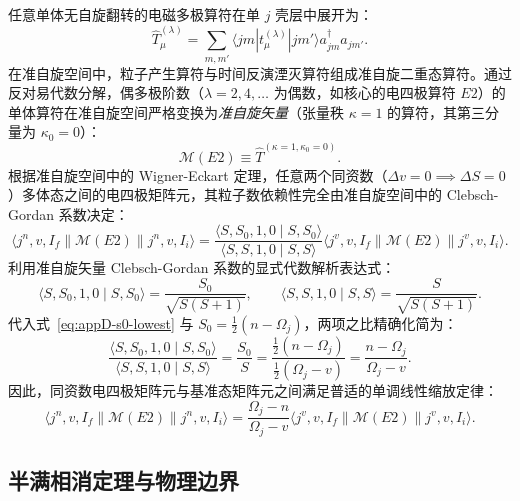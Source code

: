 任意单体无自旋翻转的电磁多极算符在单 $j$ 壳层中展开为：
\begin{equation}\label{eq:appD-one-body-em-op}
\hat{T}^{(\lambda)}_\mu = \sum_{m, m'} \langle j m | t^{(\lambda)}_\mu | j m' \rangle a_{jm}^\dagger a_{jm'}.
\end{equation}
在准自旋空间中，粒子产生算符与时间反演湮灭算符组成准自旋二重态算符。通过反对易代数分解，偶多极阶数（$\lambda = 2, 4, \dots$ 为偶数，如核心的电四极算符 $E2$）的单体算符在准自旋空间严格变换为\emph{准自旋矢量}（张量秩 $\kappa = 1$ 的算符，其第三分量为 $\kappa_0 = 0$）：
\begin{equation}\label{eq:appD-e2-quasispin-vector}
\mathcal{M}(E2) \equiv \hat{T}^{(\kappa=1, \kappa_0=0)}.
\end{equation}
根据准自旋空间中的 Wigner-Eckart 定理，任意两个同资数（$\Delta v = 0 \implies \Delta S = 0$）多体态之间的电四极矩阵元，其粒子数依赖性完全由准自旋空间中的 Clebsch-Gordan 系数决定：
\begin{equation}\label{eq:appD-wigner-eckart-quasispin}
\langle j^n, v, I_f \| \mathcal{M}(E2) \| j^n, v, I_i \rangle = \frac{\langle S, S_0, 1, 0 \mid S, S_0 \rangle}{\langle S, S, 1, 0 \mid S, S \rangle} \langle j^v, v, I_f \| \mathcal{M}(E2) \| j^v, v, I_i \rangle.
\end{equation}
利用准自旋矢量 Clebsch-Gordan 系数的显式代数解析表达式：
\begin{equation}\label{eq:appD-cg-analytical}
\langle S, S_0, 1, 0 \mid S, S_0 \rangle = \frac{S_0}{\sqrt{S(S+1)}}, \qquad \langle S, S, 1, 0 \mid S, S \rangle = \frac{S}{\sqrt{S(S+1)}}.
\end{equation}
代入式~\eqref{eq:appD-s0-lowest} 与 $S_0 = \frac{1}{2}(n - \Omega_j)$，两项之比精确化简为：
\begin{equation}\label{eq:appD-cg-ratio}
\frac{\langle S, S_0, 1, 0 \mid S, S_0 \rangle}{\langle S, S, 1, 0 \mid S, S \rangle} = \frac{S_0}{S} = \frac{\frac{1}{2}(n - \Omega_j)}{\frac{1}{2}(\Omega_j - v)} = \frac{n - \Omega_j}{\Omega_j - v}.
\end{equation}
因此，同资数电四极矩阵元与基准态矩阵元之间满足普适的单调线性缩放定律：
\begin{equation}\label{eq:appD-seniority-e2-scaling}
\langle j^n, v, I_f \| \mathcal{M}(E2) \| j^n, v, I_i \rangle = \frac{\Omega_j - n}{\Omega_j - v} \langle j^v, v, I_f \| \mathcal{M}(E2) \| j^v, v, I_i \rangle.
\end{equation}

\subsection{半满相消定理与物理边界}

